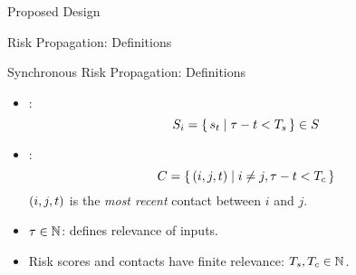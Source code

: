 \documentclass[11pt]{beamer}
\begin{document}
\begin{section}{Proposed Design}
\begin{frame}{Risk Propagation: Definitions}
\begin{figure}
\centering
{}
\end{figure}
\end{frame}

\begin{frame}{Synchronous Risk Propagation: Definitions}
\begin{itemize}
  \item {}:
    \begin{equation*}
      S_i =\set{ s_t | \tau- t< T_s} \in S
    \end{equation*}
    \item {}:
      \begin{equation*}
        C = \set{ (i, j, t) | i \neq j, \tau- t< T_c}
      \end{equation*}
      $(i, j, t)$ is the \emph{most recent} contact between $i$ and $j$.
      \item {} $\tau \in \mathbb{N}$: defines relevance of inputs.
      \item Risk scores and contacts have finite relevance: $T_s, T_c \in \mathbb{N}$.
\end{itemize}
\end{frame}


\end{section}
\end{document}
